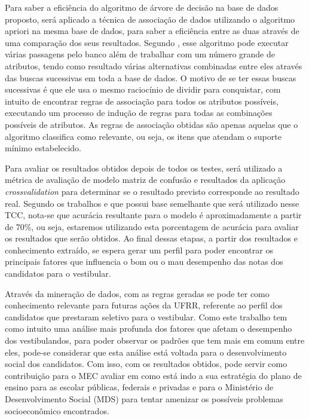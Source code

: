 \par
Para saber a eficiência do algoritmo de árvore de decisão na base de dados proposto, será aplicado a técnica de associação de dados utilizando o algoritmo apriori na mesma base de dados, para saber a eficiência entre as duas através de uma comparação dos seus resultados. Segundo , esse algoritmo pode executar várias passagens pelo banco além de trabalhar com um número grande de atributos, tendo como resultado várias alternativas combinadas entre eles através das buscas sucessivas em toda a base de dados. O motivo de se ter essas buscas sucessivas é que ele usa o mesmo raciocínio de dividir para conquistar, com intuito de encontrar regras de associação para todos os atributos possíveis, executando um processo de indução de regras para todas as combinações possíveis de atributos. As regras de associação obtidas são apenas aquelas que o algoritmo classifica como relevante, ou seja, os itens que atendam o suporte mínimo estabelecido. 


\par
Para avaliar os resultados obtidos depois de todos os testes, será utilizado a métrica de avaliação de modelo matriz de confusão e resultados da aplicação \textit{crossvalidation} para determinar se o resultado previsto corresponde ao resultado real. Segundo os trabalhos  e  que possui base semelhante que será utilizado nesse TCC, nota-se que acurácia resultante para o modelo é aproximadamente a partir de 70\%, ou seja, estaremos utilizando esta porcentagem de acurácia para avaliar os resultados que serão obtidos. Ao final dessas etapas, a partir dos resultados e conhecimento extraído, se espera gerar um perfil para poder encontrar os principais fatores que influencia o bom ou o mau desempenho das notas dos candidatos para o vestibular.

\par 
Através da mineração de dados, com as regras geradas se pode ter como conhecimento relevante para futuras ações da UFRR, referente ao perfil dos candidatos que prestaram seletivo para o vestibular. Como este trabalho tem como intuito uma análise mais profunda dos fatores que afetam o desempenho dos vestibulandos, para poder observar os padrões que tem mais em comum entre eles, pode-se considerar que esta análise está voltada para o desenvolvimento social dos candidatos. Com isso, com os resultados obtidos, pode servir como contribuição para o MEC avaliar em como está indo a sua estratégia do plano de ensino para as escolar públicas, federais e privadas e para o Ministério de Desenvolvimento Social (MDS) para tentar amenizar os possíveis problemas socioeconômico encontrados.

